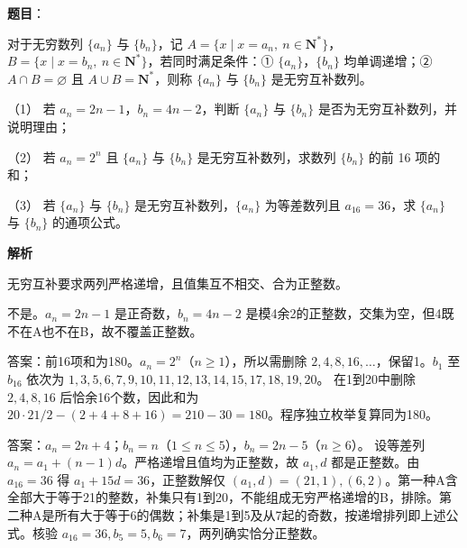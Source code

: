 \begin{answer}

\textbf{题目}：

对于无穷数列 \(\{a_n\}\) 与 \(\{b_n\}\)，记 \(A=\{x\mid x=a_n,\ n\in\mathbf N^*\}\)，\(B=\{x\mid x=b_n,\ n\in\mathbf N^*\}\)，若同时满足条件：① \(\{a_n\}\)，\(\{b_n\}\) 均单调递增；② \(A\cap B=\varnothing\) 且 \(A\cup B=\mathbf N^*\)，则称 \(\{a_n\}\) 与 \(\{b_n\}\) 是无穷互补数列。

（1） 若 \(a_n=2n-1\)，\(b_n=4n-2\)，判断 \(\{a_n\}\) 与 \(\{b_n\}\) 是否为无穷互补数列，并说明理由；

（2） 若 \(a_n=2^n\) 且 \(\{a_n\}\) 与 \(\{b_n\}\) 是无穷互补数列，求数列 \(\{b_n\}\) 的前 16 项的和；

（3） 若 \(\{a_n\}\) 与 \(\{b_n\}\) 是无穷互补数列，\(\{a_n\}\) 为等差数列且 \(a_{16}=36\)，求 \(\{a_n\}\) 与 \(\{b_n\}\) 的通项公式。

\textbf{解析}

无穷互补要求两列严格递增，且值集互不相交、合为正整数。


不是。\(a_n=2n-1\) 是正奇数，\(b_n=4n-2\) 是模4余2的正整数，交集为空，但4既不在A也不在B，故不覆盖正整数。


答案：前16项和为180。\(a_n=2^n\)（\(n\ge1\)），所以需删除 \(2,4,8,16,\ldots\)，保留1。\(b_1\) 至 \(b_{16}\) 依次为
\(1,3,5,6,7,9,10,11,12,13,14,15,17,18,19,20\)。
在1到20中删除 \(2,4,8,16\) 后恰余16个数，因此和为 \(20\cdot21/2-(2+4+8+16)=210-30=180\)。程序独立枚举复算同为180。


答案：\(a_n=2n+4\)；\(b_n=n\)（\(1\le n\le5\)），\(b_n=2n-5\)（\(n\ge6\)）。
设等差列 \(a_n=a_1+(n-1)d\)。严格递增且值均为正整数，故 \(a_1,d\) 都是正整数。由 \(a_{16}=36\) 得 \(a_1+15d=36\)，正整数解仅 \((a_1,d)=(21,1),(6,2)\)。第一种A含全部大于等于21的整数，补集只有1到20，不能组成无穷严格递增的B，排除。第二种A是所有大于等于6的偶数；补集是1到5及从7起的奇数，按递增排列即上述公式。核验 \(a_{16}=36,b_5=5,b_6=7\)，两列确实恰分正整数。




\end{answer}
